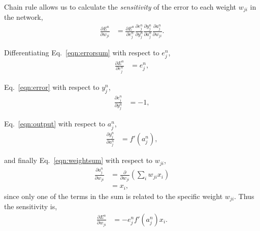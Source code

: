 \documentclass[thesis]{subfiles}
\begin{document}
Chain rule allows us to calculate the \emph{sensitivity} of the error to each weight $w_{ji}$ in the network,
\begin{equation}
\begin{aligned}
    \frac{\partial E^n}{\partial w_{ji}} &= \frac{\partial E^n}{\partial e^n_j}\frac{\partial e^n_j}{\partial y^n_j} \frac{\partial y^n_j}{\partial a^n_j} \frac{\partial a^n_j}{\partial w_{ji}}.
\end{aligned}
\end{equation}

Differentiating Eq.~\ref{eqn:errorsum} with respect to $e^n_j$,
\begin{equation}
\begin{aligned}
    \frac{\partial E^n}{\partial e^n_j} &= e^n_j,
\end{aligned}
\end{equation}

Eq.~\ref{eqn:error} with respect to $y^n_j$,
\begin{equation}
\begin{aligned}
    \frac{\partial e^n_j}{\partial y^n_j} &= -1,
\end{aligned}
\end{equation}

Eq.~\ref{eqn:output} with respect to $a^n_j$,
\begin{equation}
\begin{aligned}
   \frac{\partial y^n_j}{\partial a^n_j}  &= f'\left( a^n_j \right),
\end{aligned}
\end{equation}

and finally Eq.~\ref{eqn:weightsum} with respect to $w_{ji}$,
\begin{equation}
\begin{aligned}
   \frac{\partial a^n_j}{\partial w_{ji}} &= \frac{\partial}{\partial w_{ji}} \left( \sum_i w_{ji} x_{i} \right)\\
   &= x_i,
\end{aligned}
\label{eqn:sumonetermpartial}
\end{equation}
since only one of the terms in the sum is related to the specific weight $w_{ji}$. Thus the sensitivity is,
\begin{equation}
\label{eqn:deltasensitivity}
\begin{aligned}
    \frac{\partial E^n}{\partial w_{ji}} &= - e^n_j  f'\left( a^n_j \right) x_i.
\end{aligned}
\end{equation}
\end{document}
